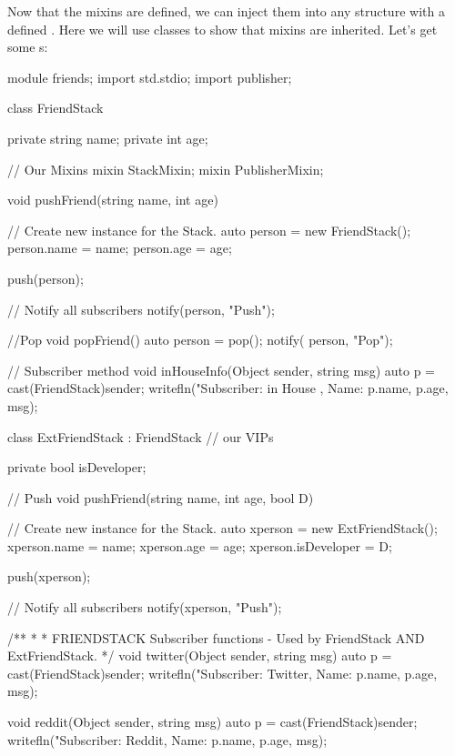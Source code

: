 Now that the mixins are defined, we can inject them into any structure with a defined . Here we will use classes to show that mixins are inherited. Let's get some s:

\begin{dcode}
module friends;
import std.stdio;
import publisher;

class FriendStack
{
    private string name;
    private int age;
    
    // Our Mixins
    mixin StackMixin;
    mixin PublisherMixin;

    void pushFriend(string name, int age)
    {
        // Create new instance for the Stack.
        auto person = new FriendStack();
        person.name = name;
        person.age = age;
                        
        push(person);
                        
        // Notify all subscribers               
        notify(person, "Push");                 
    }

    //Pop
    void popFriend()
    {
        auto person = pop();
        notify( person, "Pop");
    }

    // Subscriber method
    void inHouseInfo(Object sender, string msg)
    {
        auto p = cast(FriendStack)sender;
        writefln("Subscriber: in House , Name: %
                 p.name, p.age, msg);        
    }
}

class ExtFriendStack : FriendStack // our VIPs
{
    private bool isDeveloper;

    // Push 
    void pushFriend(string name, int age, bool D)
    {
        // Create new instance for the Stack.
        auto xperson = new ExtFriendStack();
        xperson.name = name;
        xperson.age = age;
        xperson.isDeveloper = D;
        
        push(xperson);
        
        // Notify all subscribers               
        notify(xperson, "Push");                        
    }
}

/**
 * 
 *  FRIENDSTACK Subscriber functions - Used by FriendStack AND ExtFriendStack.
 */ 
void twitter(Object sender, string msg)
{
    auto p = cast(FriendStack)sender;
    writefln("Subscriber: Twitter, Name: %
             p.name, p.age, msg);
}

void reddit(Object sender, string msg)
{
    auto p = cast(FriendStack)sender;
    writefln("Subscriber: Reddit, Name: %
             p.name, p.age, msg);
}


\end{dcode}
